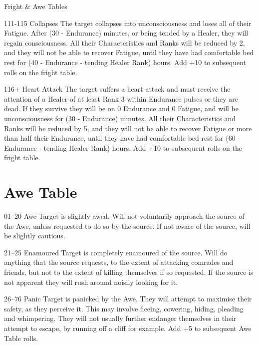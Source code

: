 \begin{Tables}{Fright \& Awe Tables}
\begin{multicols}{3}
\begin{Description}
\item[111-115] Collapses The target collapses into unconsciousness and
  loses all of their Fatigue. After (30 - Endurance) minutes, or being
  tended by a Healer, they will regain consciousness. All their
  Characteristics and Ranks will be reduced by 2, and they will not be
  able to recover Fatigue, until they have had comfortable bed rest
  for (40 - Endurance - tending Healer Rank) hours. Add +10 to
  subsequent rolls on the fright table.

\item[116+] Heart Attack The target suffers a heart attack and must
  receive the attention of a Healer of at least Rank 3 within
  Endurance pulses or they are dead. If they survive they will be on 0
  Endurance and 0 Fatigue, and will be unconsciousness for (30 -
  Endurance) minutes. All their Characteristics and Ranks will be
  reduced by 5, and they will not be able to recover Fatigue or more
  than half their Endurance, until they have had comfortable bed rest
  for (60 - Endurance - tending Healer Rank) hours. Add +10 to
  subsequent rolls on the fright table.

\end{Description} 

\end{multicols}


\section{Awe Table}
\label{table:awe}

\begin{multicols}{3}

  \begin{Description}
\item[01--20] Awe Target is slightly awed. Will not voluntarily
  approach the source of the Awe, unless requested to do so by the
  source. If not aware of the source, will be slightly cautious.

\item[21--25] Enamoured Target is completely enamoured of the
  source. Will do anything that the source requests, to the extent of
  attacking comrades and friends, but not to the extent of killing
  themselves if so requested. If the source is not apparent they will
  rush around noisily looking for it.

\item[26--76] Panic Target is panicked by the Awe. They will attempt to
  maximise their safety, as they perceive it. This may involve
  fleeing, cowering, hiding, pleading and whimpering. They will not
  usually further endanger themselves in their attempt to escape, by
  running off a cliff for example. Add +5 to subsequent Awe Table
  rolls.


\end{Description}
\end{multicols}
\end{Tables}
